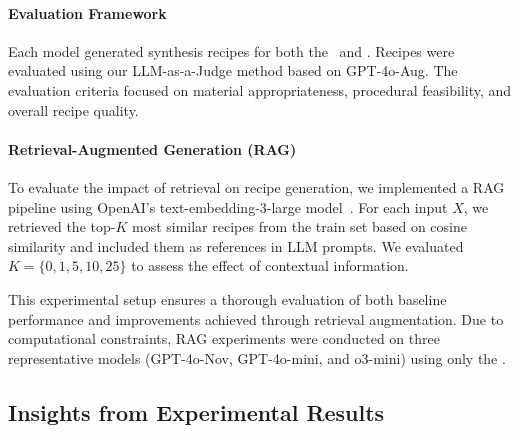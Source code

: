 \paragraph*{Evaluation Framework}
Each model generated synthesis recipes for both the \testhi~and \testsi. Recipes were evaluated using our LLM-as-a-Judge method based on GPT-4o-Aug. The evaluation criteria focused on material appropriateness, procedural feasibility, and overall recipe quality.

\paragraph*{Retrieval-Augmented Generation (RAG)}
To evaluate the impact of retrieval on recipe generation, we implemented a RAG pipeline using OpenAI's text-embedding-3-large model~\cite{OpenAIEmbeedings2022}. For each input \(X\), we retrieved the top-\(K\) most similar recipes from the train set based on cosine similarity and included them as references in LLM prompts. We evaluated \(K = \{0, 1, 5, 10, 25\}\) to assess the effect of contextual information.


This experimental setup ensures a thorough evaluation of both baseline performance and improvements achieved through retrieval augmentation. Due to computational constraints, RAG experiments were conducted on three representative models (GPT-4o-Nov, GPT-4o-mini, and o3-mini) using only the \testhi.

\subsection{Insights from Experimental Results}
\label{subsec:insights}


